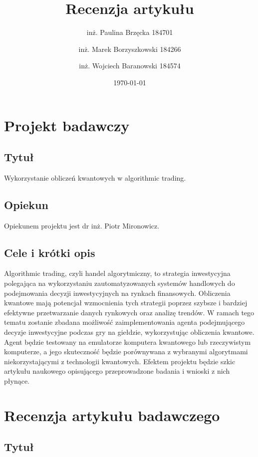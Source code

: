 \documentclass[polish,envcountsect,10pt]{article}
\title{Recenzja artykułu}
\author{inż. Paulina Brzęcka 184701 \and inż. Marek Borzyszkowski 184266 \and inż. Wojciech Baranowski 184574}
\date{\today}
\begin{document}
\maketitle
\tableofcontents
\newpage

\section{Projekt badawczy}

\subsection{Tytuł}

Wykorzystanie obliczeń kwantowych w algorithmic trading.

\subsection{Opiekun}

Opiekunem projektu jest dr inż. Piotr Mironowicz.

\subsection{Cele i krótki opis}

Algorithmic trading, czyli handel algorytmiczny, to strategia inwestycyjna polegająca na wykorzystaniu zautomatyzowanych systemów handlowych do podejmowania decyzji inwestycyjnych na rynkach finansowych. Obliczenia kwantowe mają potencjał wzmocnienia tych strategii poprzez szybsze i bardziej efektywne przetwarzanie danych rynkowych oraz analizę trendów. W ramach tego tematu zostanie zbadana możliwość zaimplementowania agenta podejmującego decyzje inwestycyjne podczas gry na giełdzie, wykorzystując obliczenia kwantowe. Agent będzie testowany na emulatorze komputera kwantowego lub rzeczywistym komputerze, a jego skuteczność będzie porównywana z wybranymi algorytmami niekorzystającymi z technologii kwantowych. Efektem projektu będzie szkic artykułu naukowego opisującego przeprowadzone badania i wnioski z nich płynące.

\section{Recenzja artykułu badawczego}

\subsection{Tytuł}
\end{document}
